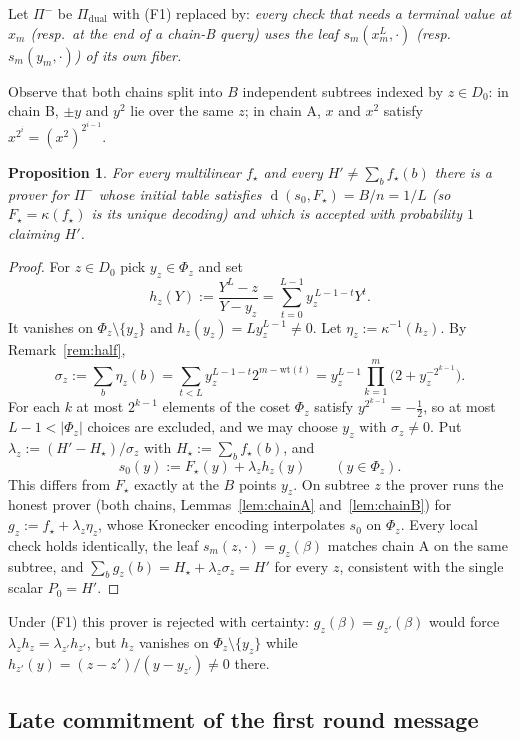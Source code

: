 \documentclass[11pt]{article}
\newtheorem{proposition}[theorem]{Proposition}
\theoremstyle{definition}
\newcommand{\wt}{\mathrm{wt}}
\DeclareMathOperator{\dist}{d}
\begin{document}
Let $\Pi^-$ be $\Pi_{\mathrm{dual}}$ with (F1) replaced by: \emph{every check that needs a terminal value at $x_m$ (resp.\ at the end of a chain-B query) uses the leaf $s_m(x_m^{L},\cdot)$ (resp.\ $s_m(y_m,\cdot)$) of its own fiber.}

Observe that both chains split into $B$ independent subtrees indexed by $z\in D_0$: in chain B, $\pm y$ and $y^2$ lie over the same $z$; in chain A, $x$ and $x^2$ satisfy $x^{2^i}=(x^2)^{2^{i-1}}$.

\begin{proposition}\label{prop:fiber}
For every multilinear $f_\star$ and every $H'\neq\sum_bf_\star(b)$ there is a prover for $\Pi^-$ whose initial table satisfies $\dist(s_0,F_\star)=B/n=1/L$ (so $F_\star=\kappa(f_\star)$ is its unique decoding) and which is accepted with probability $1$ claiming $H'$.
\end{proposition}
\begin{proof}
For $z\in D_0$ pick $y_z\in\Phi_z$ and set
\[
h_z(Y):=\frac{Y^L-z}{Y-y_z}=\sum_{t=0}^{L-1}y_z^{\,L-1-t}Y^t .
\]
It vanishes on $\Phi_z\setminus\{y_z\}$ and $h_z(y_z)=Ly_z^{L-1}\ne0$. Let $\eta_z:=\kappa^{-1}(h_z)$. By Remark~\ref{rem:half},
\[
\sigma_z:=\sum_b\eta_z(b)=\sum_{t<L}y_z^{L-1-t}2^{m-\wt(t)}=y_z^{L-1}\prod_{k=1}^m\big(2+y_z^{-2^{k-1}}\big).
\]
For each $k$ at most $2^{k-1}$ elements of the coset $\Phi_z$ satisfy $y^{2^{k-1}}=-\frac12$, so at most $L-1<|\Phi_z|$ choices are excluded, and we may choose $y_z$ with $\sigma_z\ne0$. Put $\lambda_z:=(H'-H_\star)/\sigma_z$ with $H_\star:=\sum_bf_\star(b)$, and
\[
s_0(y):=F_\star(y)+\lambda_zh_z(y)\qquad(y\in\Phi_z).
\]
This differs from $F_\star$ exactly at the $B$ points $y_z$. On subtree $z$ the prover runs the honest prover (both chains, Lemmas~\ref{lem:chainA} and~\ref{lem:chainB}) for $g_z:=f_\star+\lambda_z\eta_z$, whose Kronecker encoding interpolates $s_0$ on $\Phi_z$. Every local check holds identically, the leaf $s_m(z,\cdot)=g_z(\beta)$ matches chain A on the same subtree, and $\sum_bg_z(b)=H_\star+\lambda_z\sigma_z=H'$ for every $z$, consistent with the single scalar $P_0=H'$.
\end{proof}

Under (F1) this prover is rejected with certainty: $g_z(\beta)=g_{z'}(\beta)$ would force $\lambda_zh_z=\lambda_{z'}h_{z'}$, but $h_z$ vanishes on $\Phi_z\setminus\{y_z\}$ while $h_{z'}(y)=(z-z')/(y-y_{z'})\ne0$ there.

\subsection{Late commitment of the first round message}
\end{document}
